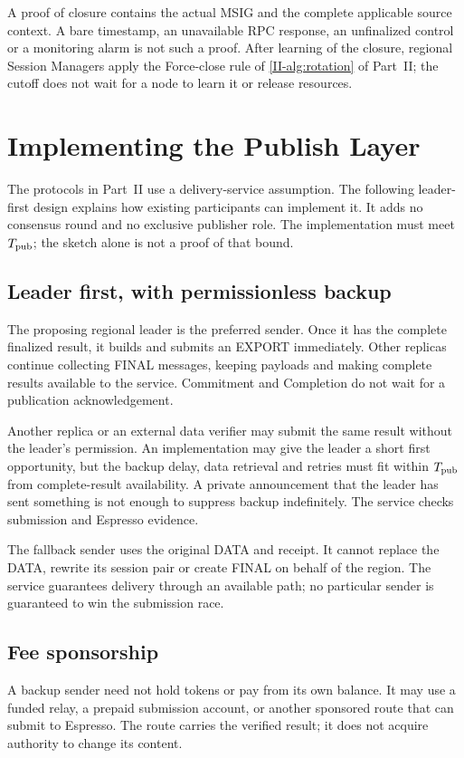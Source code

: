 \documentclass[11pt,a4paper]{article}
\newcounter{protocol}
\begin{document}
A proof of closure contains the actual MSIG and the complete applicable
source context. A bare timestamp, an unavailable RPC response, an
unfinalized control or a monitoring alarm is not such a proof. After
learning of the closure, regional Session Managers apply
the Force-close rule of \cref{II-alg:rotation} of Part~II; the cutoff does not wait
for a node to learn it or release resources.

\section{Implementing the Publish Layer}
\label{sec:publish-implementation}
The protocols in Part~II use a delivery-service assumption. The following
leader-first design explains how existing participants can implement it.
It adds no consensus round and no exclusive publisher role.
The implementation must meet $T_{\rm pub}$; the sketch alone is not a
proof of that bound.

\subsection{Leader first, with permissionless backup}
The proposing regional leader is the preferred sender. Once it has the
complete finalized result, it builds and submits an EXPORT immediately.
Other replicas continue collecting FINAL messages, keeping payloads and
making complete results available to the service. Commitment and
Completion do not wait for a publication acknowledgement.

Another replica or an external data verifier may submit the same result
without the leader's permission. An implementation may give the leader a
short first opportunity, but the backup delay, data retrieval and retries
must fit within $T_{\rm pub}$ from complete-result availability. A private
announcement that the leader has sent something is not enough to suppress
backup indefinitely. The service checks submission and Espresso evidence.

The fallback sender uses the original DATA and receipt. It cannot replace
the DATA, rewrite its session pair or create FINAL on behalf of the region.
The service guarantees delivery through an available path; no particular
sender is guaranteed to win the submission race.

\subsection{Fee sponsorship}
A backup sender need not hold tokens or pay from its own balance. It may
use a funded relay, a prepaid submission account, or another sponsored
route that can submit to Espresso. The route carries the verified result;
it does not acquire authority to change its content.
\end{document}
